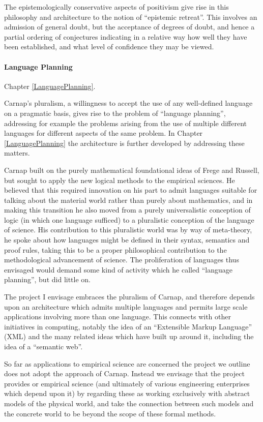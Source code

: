The epistemologically conservative aspects of positivism give rise in
this philosophy and architecture to the notion of ``epistemic
retreat''.
This involves an admission of general doubt, but the acceptance of
degrees of doubt, and hence a partial ordering of conjectures
indicating in a relative way how well they have been established, and
what level of confidence they may be viewed.

\paragraph{Language Planning}

Chapter \ref{LanguagePlanning}.

Carnap's pluralism, a willingness to accept the use of any
well-defined language on a pragmatic basis, gives rise to the problem
of ``language planning'', addressing for example the problems arising
from the use of multiple different languages for different aspects of
the same problem.
In Chapter \ref{LanguagePlanning} the architecture is further
developed by addressing these matters.

Carnap built on the purely mathematical foundational ideas of Frege
and Russell, but sought to apply the new logical methods to the
empirical sciences.
He believed that this required innovation on his part to admit
languages suitable for talking about the material world rather than
purely about mathematics, and in making this transition he also moved
from a purely universalistic conception of logic (in which one language
sufficed) to a pluralistic conception of the language of science.
His contribution to this pluralistic world was by way of meta-theory,
he spoke about how languages might be defined in their syntax,
semantics and proof rules, taking this to be a proper philosophical
contribution to the methodological advancement of science.
The proliferation of languages thus envisaged would demand some kind
of activity which he called ``language planning'', but did little on.

The project I envisage embraces the pluralism of Carnap, and therefore
depends upon an architecture which admits multiple languages and
permits large scale applications involving more than one language.
This connects with other initiatives in computing, notably the idea of
an ``Extensible Markup Language'' (XML) and the many related ideas
which have built up around it, including the idea of a ``semantic web''.

So far as applications to empirical science are concerned the project
we outline does not adopt the approach of Carnap.
Instead we envisage that the project provides or empirical science
(and ultimately of various engineering enterprises which depend upon it)
by regarding these as working exclusively with abstract models of the
physical world, and take the connection between such models and the
concrete world to be beyond the scope of these formal methods.

